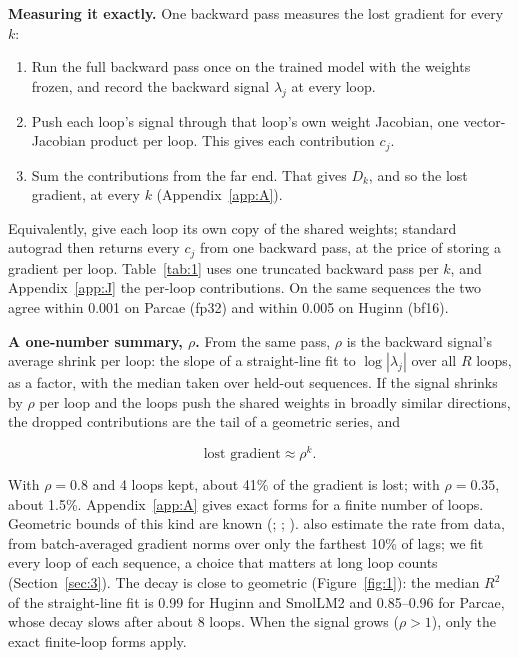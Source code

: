 \documentclass[10pt]{article}
\begin{document}
\textbf{Measuring it exactly.} One backward pass measures the lost gradient for every $k$:

\begin{enumerate}
\item Run the full backward pass once on the trained model with the weights frozen, and record the backward signal $\lambda_j$ at every loop.
\item Push each loop's signal through that loop's own weight Jacobian, one vector-Jacobian product per loop. This gives each contribution $c_j$.
\item Sum the contributions from the far end. That gives $D_k$, and so the lost gradient, at every $k$ (Appendix~\ref{app:A}).
\end{enumerate}

Equivalently, give each loop its own copy of the shared weights; standard autograd then returns every $c_j$ from one backward pass, at the price of storing a gradient per loop. Table~\ref{tab:1} uses one truncated backward pass per $k$, and Appendix~\ref{app:J} the per-loop contributions. On the same sequences the two agree within 0.001 on Parcae (fp32) and within 0.005 on Huginn (bf16).

\textbf{A one-number summary, $\rho$.} From the same pass, $\rho$ is the backward signal's average shrink per loop: the slope of a straight-line fit to $\log|\lambda_j|$ over all $R$ loops, as a factor, with the median taken over held-out sequences. If the signal shrinks by $\rho$ per loop and the loops push the shared weights in broadly similar directions, the dropped contributions are the tail of a geometric series, and

\begin{equation*}\text{lost gradient}\approx\rho^{k}.\end{equation*}

With $\rho = 0.8$ and 4 loops kept, about 41\% of the gradient is lost; with $\rho = 0.35$, about 1.5\%. Appendix~\ref{app:A} gives exact forms for a finite number of loops. Geometric bounds of this kind are known (\citealp[Thm.~1]{aicher2019}; \citealp{liao2018}; \citealp[Prop.~1]{movahedi2026fprm}). \citet[Sec.~4.2]{aicher2019} also estimate the rate from data, from batch-averaged gradient norms over only the farthest 10\% of lags; we fit every loop of each sequence, a choice that matters at long loop counts (Section~\ref{sec:3}). The decay is close to geometric (Figure~\ref{fig:1}): the median $R^{2}$ of the straight-line fit is 0.99 for Huginn and SmolLM2 and 0.85--0.96 for Parcae, whose decay slows after about 8 loops. When the signal grows ($\rho > 1$), only the exact finite-loop forms apply.
\end{document}
